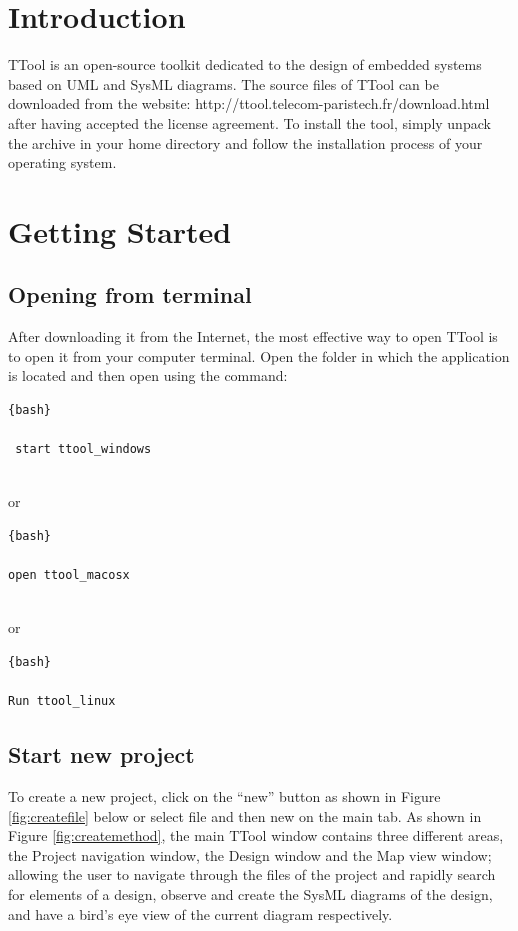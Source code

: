 \documentclass[12pt]{article}
\begin{document}
\newpage
\section{Introduction}

TTool is an open-source toolkit dedicated to the design of embedded systems based on UML and SysML diagrams. The source files of TTool can be downloaded from the website: http://ttool.telecom-paristech.fr/download.html
after having accepted the license agreement. To install the tool, simply unpack the archive in your home directory and follow the installation process of your operating system.

\section{Getting Started}
\subsection{Opening from terminal}

After downloading it from the Internet, the most effective way to open TTool is to open it from your computer terminal. Open the folder in which the application is located and then open using the command:
\begin{lstlisting}{bash}

 start ttool_windows
 

\end{lstlisting}

or 
\begin{lstlisting}{bash}

open ttool_macosx
 

\end{lstlisting}

or \begin{lstlisting}{bash}

Run ttool_linux

\end{lstlisting}


\subsection{Start new project}
To create a new project, click on the “new” button as shown in Figure \ref{fig:createfile} below or select file and then new on the main tab. As shown in Figure \ref{fig:createmethod}, the main TTool window contains three different areas, the Project navigation window, the Design window and the Map view window; allowing the user to navigate through the files of the project and rapidly search for elements of a design, observe and create the SysML diagrams of the design, and have a bird’s eye view of the current diagram respectively.
\end{document}
